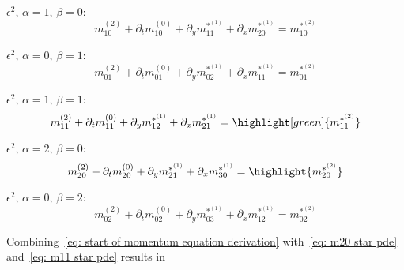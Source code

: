 $\epsilon^2$, $\alpha=1$, $\beta=0$:
\begin{equation}
  \label{eq: m10 star pde}
  m_{10}^{(2)} + \partial_t m_{10}^{(0)} + \partial_y m_{11}^{*^{(1)}} + \partial_x m_{20}^{*^{(1)}} = m_{10}^{*^{(2)}}
\end{equation}

$\epsilon^2$, $\alpha=0$, $\beta=1$:
\begin{equation}
  \label{eq: m01 star pde}
  m_{01}^{(2)} + \partial_t m_{01}^{(0)} + \partial_y m_{02}^{*^{(1)}} + \partial_x m_{11}^{*^{(1)}} = m_{01}^{*^{(2)}}
\end{equation}

$\epsilon^2$, $\alpha=1$, $\beta=1$:
\begin{equation}
  \label{eq: m11 star pde}
  m_{11}^{(2)} + \partial_t m_{11}^{(0)} + \partial_y m_{12}^{*^{(1)}} + \partial_x m_{21}^{*^{(1)}} = \highlight[green]{m_{11}^{*^{(2)}}}
\end{equation}

$\epsilon^2$, $\alpha=2$, $\beta=0$:
\begin{equation}
  \label{eq: m20 star pde}
  m_{20}^{(2)} + \partial_t m_{20}^{(0)} + \partial_y m_{21}^{*^{(1)}} + \partial_x m_{30}^{*^{(1)}} = \highlight{m_{20}^{*^{(2)}}}
\end{equation}

$\epsilon^2$, $\alpha=0$, $\beta=2$:
\begin{equation}
  \label{eq: m02 star pde}
  m_{02}^{(2)} + \partial_t m_{02}^{(0)} + \partial_y m_{03}^{*^{(1)}} + \partial_x m_{12}^{*^{(1)}} = m_{02}^{*^{(2)}}
\end{equation}

Combining~\eqref{eq: start of momentum equation derivation} with~\eqref{eq: m20 star pde} and~\eqref{eq: m11 star pde} results in

